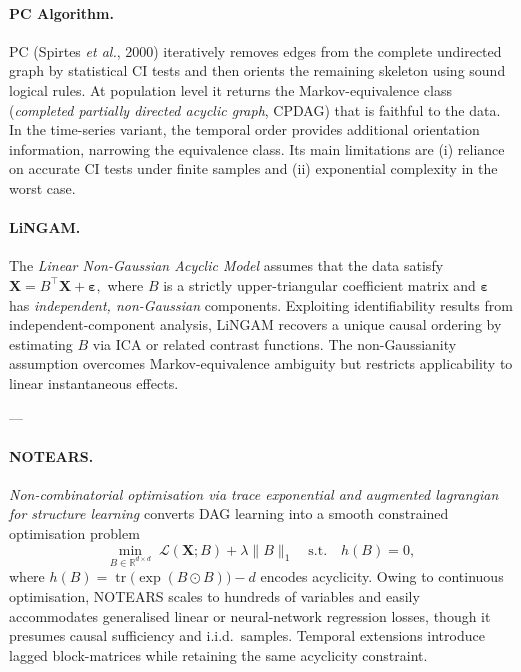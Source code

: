 \documentclass[14pt]{extarticle}
\begin{document}
	\paragraph*{PC Algorithm.}  
	PC (Spirtes \emph{et al.}, 2000) iteratively removes edges from the complete undirected graph by statistical CI tests and then orients the remaining skeleton using sound logical rules.  At population level it returns the Markov-equivalence class (\emph{completed partially directed acyclic graph}, CPDAG) that is faithful to the data.  In the time-series variant, the temporal order provides additional orientation information, narrowing the equivalence class.  Its main limitations are (i) reliance on accurate CI tests under finite samples and (ii) exponential complexity in the worst case.  
	
	
	\paragraph*{LiNGAM.}  
	The \emph{Linear Non-Gaussian Acyclic Model} assumes that the data satisfy  
	$
	\mathbf X = B^\top\mathbf X + \boldsymbol\varepsilon,
	$
	where $B$ is a strictly upper-triangular coefficient matrix and $\boldsymbol\varepsilon$ has \emph{independent, non-Gaussian} components.  Exploiting identifiability results from independent-component analysis, LiNGAM recovers a unique causal ordering by estimating $B$ via ICA or related contrast functions.  The non-Gaussianity assumption overcomes Markov-equivalence ambiguity but restricts applicability to linear instantaneous effects.  
	
	---
	
	\paragraph*{NOTEARS.}  
	\emph{Non-combinatorial optimisation via trace exponential and augmented lagrangian for structure learning} converts DAG learning into a smooth constrained optimisation problem  
	$$
	\min_{B\in\mathbb R^{d\times d}} \;\mathcal L(\mathbf X;B)+\lambda\|B\|_1
	\quad\text{s.t.}\quad
	h(B)=0,
	$$
	where $h(B)=\operatorname{tr}\!\big(\exp(B\odot B)\big)-d$ encodes acyclicity.  Owing to continuous optimisation, NOTEARS scales to hundreds of variables and easily accommodates generalised linear or neural-network regression losses, though it presumes causal sufficiency and i.i.d.\ samples.  Temporal extensions introduce lagged block-matrices while retaining the same acyclicity constraint.  
	
\end{document}
